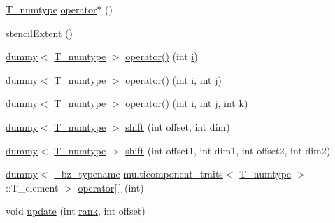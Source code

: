 \begin{DoxyCompactItemize}
\item 
\hyperlink{classstencilExtent_a93a97a73c5ca309121de8deb65521b0a}{T\+\_\+numtype} \hyperlink{classstencilExtent_a64f4e4a657d062c7f5f82278b1c08823}{operator$\ast$} ()
\item 
\hyperlink{classstencilExtent_aa1e790dbedebb7e4999e3813dfe38df7}{stencil\+Extent} ()
\item 
\hyperlink{classdummy}{dummy}$<$ \hyperlink{classstencilExtent_a93a97a73c5ca309121de8deb65521b0a}{T\+\_\+numtype} $>$ \hyperlink{classstencilExtent_a9ad049fc2e6f420d3c2211f3056983fb}{operator()} (int \hyperlink{indexexpr_8h_aabd77643995707c185e95c8cb2782c81}{i})
\item 
\hyperlink{classdummy}{dummy}$<$ \hyperlink{classstencilExtent_a93a97a73c5ca309121de8deb65521b0a}{T\+\_\+numtype} $>$ \hyperlink{classstencilExtent_a3fbfb5f9202dbb7d2ab99d86fea23ff7}{operator()} (int \hyperlink{indexexpr_8h_aabd77643995707c185e95c8cb2782c81}{i}, int \hyperlink{indexexpr_8h_aa1f3325d66516548e69238097857fa98}{j})
\item 
\hyperlink{classdummy}{dummy}$<$ \hyperlink{classstencilExtent_a93a97a73c5ca309121de8deb65521b0a}{T\+\_\+numtype} $>$ \hyperlink{classstencilExtent_ab1fca3bc4515ba38ec36a00c4e35238f}{operator()} (int \hyperlink{indexexpr_8h_aabd77643995707c185e95c8cb2782c81}{i}, int \hyperlink{indexexpr_8h_aa1f3325d66516548e69238097857fa98}{j}, int \hyperlink{indexexpr_8h_abb72938a198351550846b37a84588b63}{k})
\item 
\hyperlink{classdummy}{dummy}$<$ \hyperlink{classstencilExtent_a93a97a73c5ca309121de8deb65521b0a}{T\+\_\+numtype} $>$ \hyperlink{classstencilExtent_a71c0e921f77f32d2428a7c6e9fb590fd}{shift} (int offset, int dim)
\item 
\hyperlink{classdummy}{dummy}$<$ \hyperlink{classstencilExtent_a93a97a73c5ca309121de8deb65521b0a}{T\+\_\+numtype} $>$ \hyperlink{classstencilExtent_ad2a78ec35b107a2b250d9be75dec1588}{shift} (int offset1, int dim1, int offset2, int dim2)
\item 
\hyperlink{classdummy}{dummy}$<$ \hyperlink{compiler_8h_a1bc40add3e72effc9cf69dbe445cbdfd}{\+\_\+bz\+\_\+typename} \hyperlink{structmulticomponent__traits}{multicomponent\+\_\+traits}$<$ \hyperlink{classstencilExtent_a93a97a73c5ca309121de8deb65521b0a}{T\+\_\+numtype} $>$\+::T\+\_\+element $>$ \hyperlink{classstencilExtent_a79815df302132656c8996f647269894e}{operator\mbox{[}$\,$\mbox{]}} (int)
\item 
void \hyperlink{classstencilExtent_a423b60ee98472ada39dc1c337bcf54e3}{update} (int \hyperlink{zfftnd_8c_a6cfd95afd0afebd625b889fb6e58371c}{rank}, int offset)

\end{DoxyCompactItemize}
